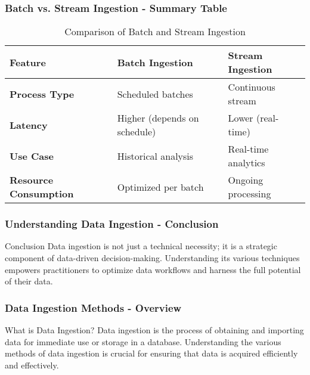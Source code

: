 \documentclass{beamer}
\begin{document}
\begin{frame}[fragile]
    \frametitle{Batch vs. Stream Ingestion - Summary Table}
    \begin{table}[]
        \centering
        \begin{tabular}{|l|l|l|}
            \hline
            \textbf{Feature}          & \textbf{Batch Ingestion}          & \textbf{Stream Ingestion}        \\ \hline
            \textbf{Process Type}     & Scheduled batches                 & Continuous stream                 \\ \hline
            \textbf{Latency}          & Higher (depends on schedule)      & Lower (real-time)                 \\ \hline
            \textbf{Use Case}         & Historical analysis                & Real-time analytics               \\ \hline
            \textbf{Resource Consumption} & Optimized per batch            & Ongoing processing                \\ \hline
        \end{tabular}
        \caption{Comparison of Batch and Stream Ingestion}
    \end{table}
\end{frame}

\begin{frame}[fragile]
    \frametitle{Understanding Data Ingestion - Conclusion}
    \begin{block}{Conclusion}
        Data ingestion is not just a technical necessity; it is a strategic component of data-driven decision-making. Understanding its various techniques empowers practitioners to optimize data workflows and harness the full potential of their data.
    \end{block}
\end{frame}

\begin{frame}[fragile]
    \frametitle{Data Ingestion Methods - Overview}
    \begin{block}{What is Data Ingestion?}
        Data ingestion is the process of obtaining and importing data for immediate use or storage in a database. 
        Understanding the various methods of data ingestion is crucial for ensuring that data is acquired efficiently and effectively.
    \end{block}
\end{frame}
\end{document}
